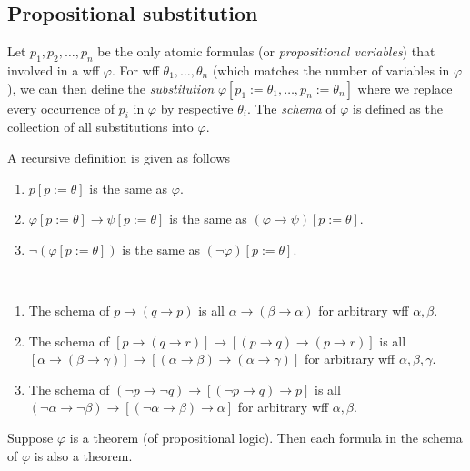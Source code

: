 \documentclass{treatise}
\begin{document}
\subsection{Propositional substitution}
Let $p_1, p_2, \hdots, p_n$ be the only atomic formulas (or \emph{propositional variables}) that involved in a wff $\varphi$. For wff $\theta_1, \hdots, \theta_n$ (which matches the number of variables in $\varphi$), we can then define the \emph{substitution} $\varphi[p_1 := \theta_1, \hdots, p_n := \theta_n]$ where we replace every occurrence of $p_i$ in $\varphi$ by respective $\theta_i$. The \emph{schema} of $\varphi$ is defined as the collection of all substitutions into $\varphi$.
\begin{remark}\label{logic-prin-uni-sub} A recursive definition is given as follows
\begin{enumerate}
	\item $p[p := \theta]$ is the same as $\varphi$.
	\item $\varphi[p := \theta] \to \psi[p := \theta]$ is the same as $(\varphi \to \psi)[p := \theta]$.
	\item $\neg (\varphi[p := \theta])$ is the same as $(\neg \varphi)[p := \theta]$.
\end{enumerate}
\end{remark}
\begin{example} \ 
\begin{enumerate}
    \item The schema of $p \to (q \to p)$ is all $\alpha \to (\beta \to \alpha)$ for arbitrary wff $\alpha, \beta$.
    \item The schema of $[p \to (q \to r)] \to [(p \to q) \to (p \to r)]$ is all $[\alpha \to (\beta \to \gamma)] \to [(\alpha \to \beta) \to (\alpha \to \gamma)]$ for arbitrary wff $\alpha, \beta, \gamma$.
    \item The schema of $(\neg p \to \neg q) \to [(\neg p \to q) \to p]$ is all $(\neg \alpha \to \neg \beta) \to [(\neg \alpha \to \beta) \to \alpha]$ for arbitrary wff $\alpha, \beta$.
\end{enumerate}
\end{example}
\begin{theorem}
Suppose $\varphi$ is a theorem (of propositional logic). Then each formula in the schema of $\varphi$ is also a theorem.
\end{theorem}
\end{document}
